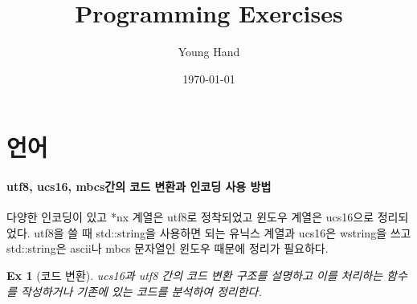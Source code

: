 \documentclass{article}
\theoremstyle{plain}
\newtheorem{ex}{Ex}[section]
\theoremstyle{definition}
\theoremstyle{remark}
\begin{document}
\title{Programming Exercises}
\author{Young Hand}
\date{\today}

\maketitle

\newpage
\tableofcontents
\newpage
{}


\section{언어}

\paragraph{utf8, ucs16, mbcs간의 코드 변환과 인코딩 사용 방법}
다양한 인코딩이 있고 *nx 계열은 utf8로 정착되었고 윈도우 계열은 ucs16으로 정리되었다. 
utf8을 쓸 때 std::string을 사용하면 되는 유닉스 계열과 ucs16은 wstring을 쓰고 
std::string은 ascii나 mbcs 문자열인 윈도우 때문에 정리가 필요하다. 

\begin{ex}[코드 변환]
ucs16과 utf8 간의 코드 변환 구조를 설명하고 이를 처리하는 함수를 작성하거나 
기존에 있는 코드를 분석하여 정리한다.
\end{ex}
\end{document}
